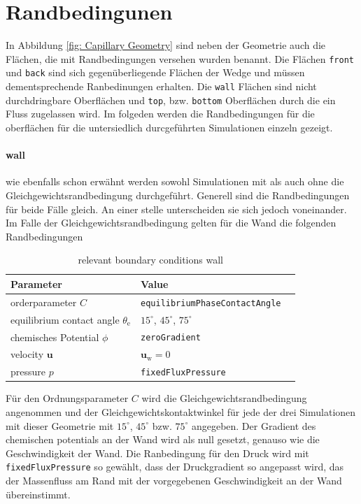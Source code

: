 \section{Randbedingunen}
In Abbildung \ref{fig: Capillary Geometry} sind neben der Geometrie auch die Flächen, die mit Randbedingungen versehen wurden benannt. Die Flächen \texttt{front} und \texttt{back} sind sich gegenüberliegende Flächen der Wedge und müssen dementsprechende Ranbedinungen erhalten. Die \texttt{wall} Flächen sind nicht durchdringbare Oberflächen und \texttt{top}, bzw. \texttt{bottom} Oberflächen durch die ein Fluss zugelassen wird.
Im folgeden werden die Randbedingungen für die oberflächen für die untersiedlich durcgeführten Simulationen einzeln gezeigt.
\paragraph{wall}
wie ebenfalls schon erwähnt werden sowohl Simulationen mit als auch ohne die Gleichgewichtsrandbedingung durchgeführt. Generell sind die Randbedingungen für beide Fälle gleich. An einer stelle unterscheiden sie sich jedoch voneinander. 
Im Falle der Gleichgewichtsrandbedingung gelten für die Wand die folgenden Randbedingungen

\begin{table}[h]
    \centering
        \caption{relevant boundary conditions wall}
        \label{tab: BoandaryConditions_wall}
        \begin{tabular}{lll}
            Parameter & Value \\ \hline
            orderparameter $C$ & \texttt{equilibriumPhaseContactAngle}     \\
            equilibrium contact angle $\theta_{\mathrm{e}}$ & $15^{\circ}$, $45^{\circ}$, $75^{\circ}$\\
            chemisches Potential $\phi$   & \texttt{zeroGradient}        \\ 
            velocity $\mathbf{u}$ &   $\mathbf{u_{\mathrm{w}}} = 0$\\
            pressure $p$&  \texttt{fixedFluxPressure} \\
        \end{tabular}
\end{table}
Für den Ordnungsparameter $C$ wird die Gleichgewichtsrandbedingung angenommen und der Gleichgewichtskontaktwinkel für jede der drei Simulationen mit dieser Geometrie mit $15^{\circ}$, $45^{\circ}$ bzw. $75^{\circ}$ angegeben. Der Gradient des chemischen potentials an der Wand wird als null gesetzt, genauso wie die Geschwindigkeit der Wand. Die Ranbedingung für den Druck wird mit \texttt{fixedFluxPressure} so gewählt, dass der Druckgradient so angepasst wird, das der Massenfluss am Rand mit der vorgegebenen Geschwindigkeit an der Wand übereinstimmt. 